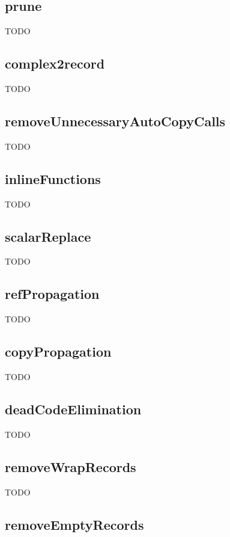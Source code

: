\documentclass[10pt]{article}
\begin{document}
\subsection{prune}

TODO

\subsection{complex2record}

TODO

\subsection{removeUnnecessaryAutoCopyCalls}

TODO

\subsection{inlineFunctions}

TODO

\subsection{scalarReplace}

TODO

\subsection{refPropagation}

TODO

\subsection{copyPropagation}

TODO

\subsection{deadCodeElimination}

TODO

\subsection{removeWrapRecords}

TODO

\subsection{removeEmptyRecords}
\end{document}
